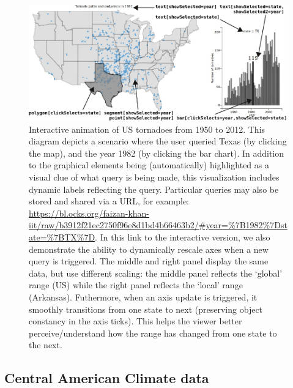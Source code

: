 \documentclass[12pt,]{article}
\theoremstyle{definition}
\theoremstyle{definition}
\theoremstyle{definition}
\theoremstyle{remark}
\begin{document}
\begin{figure}
\centering
\includegraphics{images/figure-tornado}
\caption{\label{fig:tornado}Interactive animation of US tornadoes from 1950
to 2012. This diagram depicts a scenario where the user queried Texas
(by clicking the map), and the year 1982 (by clicking the bar chart). In
addition to the graphical elements being (automatically) highlighted as
a visual clue of what query is being made, this visualization includes
dynamic labels reflecting the query. Particular queries may also be
stored and shared via a URL, for example:
\url{https://bl.ocks.org/faizan-khan-iit/raw/b3912f21ec2750f96e8d1bd4b66463b2/\#year=\%7B1982\%7Dstate=\%7BTX\%7D}.
In this link to the interactive version, we also demonstrate the ability
to dynamically rescale axes when a new query is triggered. The middle
and right panel display the same data, but use different scaling: the
middle panel reflects the `global' range (US) while the right panel
reflects the `local' range (Arkansas). Futhermore, when an axis update
is triggered, it smoothly transitions from one state to next (preserving
object constancy in the axis ticks). This helps the viewer better
perceive/understand how the range has changed from one state to the
next.}
\end{figure}

\hypertarget{central-american-climate-data}{%
\subsection{Central American Climate
data}\label{central-american-climate-data}}
\end{document}
